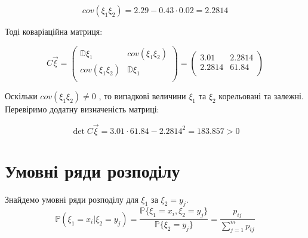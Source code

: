 \documentclass[14pt, a4paper, ukrainian]{extreport}
\begin{document}
	$$ cov(\xi_1\xi_2) = 2.29 - 0.43\cdot0.02 = 2.2814 $$
	
	Тоді коваріаційна матриця:
	
	$$ C{\vec\xi} = \begin{pmatrix}
		\mathbb{D}\xi_1 & cov(\xi_1\xi_2)\\
		cov(\xi_1\xi_2) & \mathbb{D}\xi_1\\
	\end{pmatrix} = 
	\begin{pmatrix}
		3.01 & 2.2814\\
		2.2814 & 61.84\\
	\end{pmatrix}
	$$
	
	Оскільки $ cov(\xi_1\xi_2) \neq 0 $ , то випадкові величини $\xi_1$ та $\xi_2$ корельовані та залежні.
	Перевіримо додатну визначеність матриці:
	
	$$\det{C\vec{\xi}} = 3.01 \cdot 61.84 - 2.2814^2 = 183.857 > 0$$
	 
	\section{Умовні ряди розподілу}
	Знайдемо умовні ряди розподілу для $\xi_1$ за $\xi_2 = y_j$.
	$$\mathbb{P}(\xi_1=x_i|\xi_2=y_j) = \frac{\mathbb{P}\{ \xi_1 = x_i, \xi_2 = y_j\}}{\mathbb{P}\{\xi_2=y_j\}} = \frac{p_{ij}}{\sum_{j=1}^{m}p_{ij}}$$
	
	\begin{table}[H]
		\caption{\label{tab:px|py}Умовні ряди розподілу для $\xi_1$ за $\xi_2 = y_j$}
		\begin{center}
		\end{center}
	\end{table}
\end{document}
